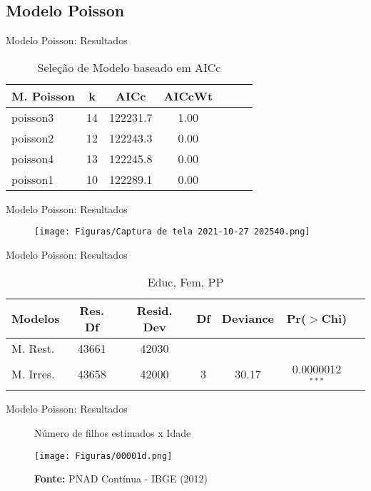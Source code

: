 \documentclass[xcolor={dvipsnames}]{beamer}
\begin{document}
\subsection{Modelo Poisson}
\begin{frame}{Modelo Poisson: Resultados}
\begin{table}[H]
    \caption{Seleção de Modelo baseado em AICc}
    \centering
    \begin{tabular}{l|c|ccccc}\hline
    M. Poisson& k  & AICc     & AICcWt\\\hline
    poisson3  & 14 & 122231.7 & 1.00  \\
    poisson2  & 12 & 122243.3 & 0.00  \\
    poisson4  & 13 & 122245.8 & 0.00  \\
    poisson1  & 10 & 122289.1 & 0.00  \\\hline
    \end{tabular}
\end{table}
\end{frame}

\begin{frame}{Modelo Poisson: Resultados}
    \begin{figure}
        \centering
        \texttt{[image: Figuras/Captura de tela 2021-10-27 202540.png]}
    \end{figure}
\end{frame}

\begin{frame}{Modelo Poisson: Resultados}
    \begin{table}[H]
        \caption{Educ, Fem, PP}
        \centering
        \begin{adjustbox}{width=\columnwidth,center}
            \begin{tabular}{l|c|ccccc}\hline
    Modelos   & Res. Df & Resid. Dev & Df & Deviance & Pr($>$Chi)       \\\hline
    M. Rest.  & 43661   & 42030      &    &          & \\
    M. Irres. & 43658   & 42000      & 3  & 30.17    &  0.0000012$^{***}$ \\\hline
            \end{tabular}
        \end{adjustbox}
\end{table}
\end{frame}

\begin{frame}{Modelo Poisson: Resultados}
    \begin{figure}[H]
    \centering
    \caption{Número de filhos estimados x Idade}
    \texttt{[image: Figuras/00001d.png]}
    \caption*{\textbf{Fonte: }PNAD Contínua - IBGE (2012)}
\end{figure}
\end{frame}
\end{document}
